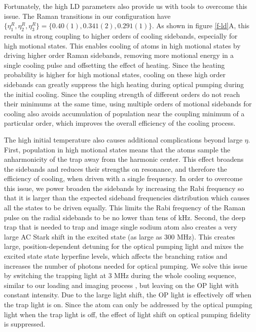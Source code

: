\documentclass[aps,prl,twocolumn,groupedaddress]{revtex4-1}
\begin{document}
Fortunately, the high LD parameters also
provide us with tools to overcome this issue. The Raman transitions in our configuration have $\{\eta^R_{1},\eta^R_{2},\eta^R_{3}\} = \{0.40(1), 0.341(2), 0.291(1)\}$. As shown in
figure \ref{f-ld}A, this results in strong coupling to higher orders
of cooling sidebands, especially for high motional states.
This enables cooling of atoms in high motional states by driving higher order Raman sidebands,
removing more motional energy in a single cooling pulse and offsetting the effect of heating. Since the heating probability is higher for high motional states,
cooling on these high order sidebands can greatly suppress the high heating during
optical pumping during the initial cooling. Since the coupling strength of different orders
do not reach their minimums at the same time, using multiple orders of motional sidebands
for cooling also avoids accumulation of population near the coupling minimum of a particular
order, which improves the overall efficiency of the cooling process.

The high initial temperature also causes additional complications beyond large $\eta$.
First, population in high motional states means that the atoms sample
the anharmonicity of the trap away from the harmonic center.
This effect broadens the sidebands and reduces their strengths on resonance,
and therefore the efficiency of cooling, when driven with a single frequency.
In order to overcome this issue, we power broaden the sidebands by increasing the Rabi frequency
so that it is larger than the expected sideband frequencies distribution
which causes all the states to be driven equally.
This limits the Rabi frequency of the Raman pulse on the radial sidebands to be no lower
than tens of kHz.
Second, the deep trap that is needed to trap and image single sodium atom also creates
a very large AC Stark shift in the excited state (as large as 300 MHz).
This creates large, position-dependent detuning for the optical pumping light and mixes the excited state state hyperfine levels,
which affects the branching ratios and increases the number of photons needed for optical pumping.
We solve this issue by switching the trapping light at 3 MHz
during the whole cooling sequence, similar to our loading and imaging process
\cite{Hutzler2017-LightShifts}, but leaving on the OP light with constant intensity.
Due to the large light shift, the OP light is effectively off when the trap light is on.
Since the atom can only be addressed by the optical pumping light when the trap light is off,
the effect of light shift on optical pumping fidelity is suppressed.
\end{document}
